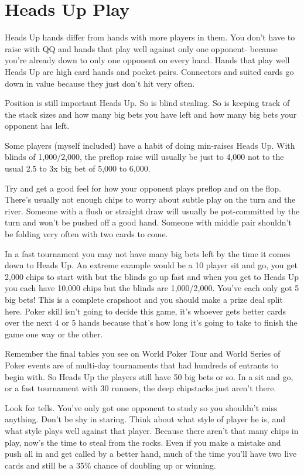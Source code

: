 \section{Heads Up Play}

Heads Up hands differ from hands with more players in them.
You don't have to raise with QQ and hands that play well
against only one opponent- because you're already down
to only one opponent on every hand. Hands that play
well Heads Up are high card hands and pocket pairs.
Connectors and suited cards go down in value because
they just don't hit very often.

Position is still important Heads Up. So is blind stealing.
So is keeping track of the stack sizes and how many big bets
you have left and how many big bets your opponent has left.

Some players (myself included) have a habit of doing min-raises
Heads Up. With blinds of 1,000/2,000, the preflop raise will usually
be just to 4,000 not to the usual 2.5 to 3x big bet of 5,000 to 6,000.

Try and get a good feel for how your opponent plays
preflop and on the flop. There's usually not enough
chips to worry about subtle play on the turn and the river.
Someone with a flush or straight draw will usually be
pot-committed by the turn and won't be pushed off a
good hand. Someone with middle pair shouldn't be folding
very often with two cards to come.

In a fast tournament you may not have many big bets left by
the time it comes down to Heads Up. An extreme example would
be a 10 player sit and go, you get 2,000 chips to start with
but the blinds go up fast and when you get to Heads Up
you each have 10,000 chips but the blinds are 1,000/2,000.
You've each only got 5 big bets! This is a complete
crapshoot and you should make a prize deal split here. Poker skill
isn't going to decide this game, it's whoever gets better
cards over the next 4 or 5 hands because that's how long
it's going to take to finish the game one way or the other.

Remember the final tables you see on World Poker Tour and
World Series of Poker events are of multi-day tournaments that had
hundreds of entrants to begin with. So Heads Up the players
still have 50 big bets or so. In a sit and go, or
a fast tournament with 30 runners, the deep chipstacks
just aren't there.

Look for tells. You've only got one opponent to study so
you shouldn't miss anything. Don't be shy in staring.
Think about what style of player he is, and what style
plays well against that player. Because there aren't
that many chips in play, now's the time to steal from
the rocks. Even if you make a mistake and push all in
and get called by a better hand, much of the time you'll
have two live cards and still be a 35\% chance of doubling
up or winning.

